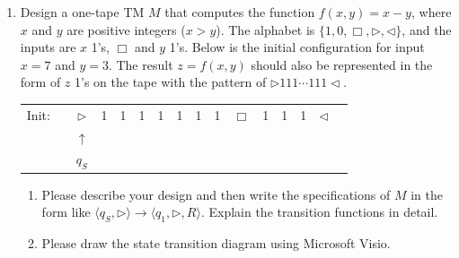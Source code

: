 \documentclass[12pt,a4paper]{article}
\theoremstyle{definition}
\begin{document}
\begin{enumerate}
    \item
    Design a one-tape TM $M$ that computes the function $f(x, y) = x - y$, where $x$ and $y$ are positive integers ($x > y$). The alphabet is $\{1, 0, \Box, \triangleright, \triangleleft\}$, and the inputs are $x$ 1's, $\Box$ and $y$ 1's. Below is the initial configuration for input $x=7$ and $y=3$. The result $z=f(x, y)$ should also be represented in the form of $z$ 1's on the tape with the pattern of $\triangleright 111 \cdots 111 \triangleleft$.

    \begin{center}
    \begin{tabular}{ll|c|c|c|c|c|c|c|c|c|c|c|c|c|c}
    	\cline{2-16}
    	Init:& & $\triangleright$ &  1  & 1 & 1 & 1 & 1 & 1 & 1 & $\Box$ & 1 & 1 & 1 & $ \triangleleft$ & \\
    	\cline{2-16}
    	\multicolumn{2}{c}{} & \multicolumn{1}{c}{$\uparrow$} & \multicolumn{11}{c}{}\\
    	\multicolumn{2}{c}{} & \multicolumn{1}{c}{$q_S$} & \multicolumn{11}{c}{}\\
    \end{tabular}
    \end{center}

    \begin{enumerate}
        \item
        Please describe your design and then write the specifications of $M$ in the form like $\langle q_S, \triangleright \rangle \rightarrow \langle q_1, \triangleright,  R\rangle$. Explain the transition functions in detail.

        \item
        Please draw the state transition diagram using Microsoft Visio.


\end{enumerate}
\end{enumerate}
\end{document}
